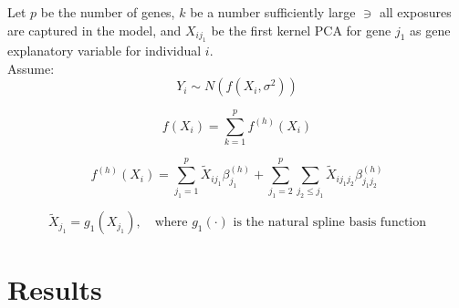 \documentclass{article}\usepackage[]{graphicx}\usepackage[]{color}
\begin{document}
Let $p$ be the number of genes, $k$ be a number sufficiently large $\ni$ all exposures are captured in the model, and $X_{ij_1}$ be the first kernel PCA for gene $j_1$ as gene explanatory variable for individual $i$.\\

Assume:\\
\begin{equation}
Y_i \sim N(f(X_i, \sigma^2)) \tag{1.1}
\end{equation}

\begin{equation}
f(X_i) = \sum_{k=1}^p f^{(h)}(X_i) \tag{1.2}
\end{equation}

\begin{equation}
f^{(h)}(X_i) = \sum_{j_1 =1}^p \tilde{X}_{ij_1}\beta_{j_1}^{(h)} + \sum_{j_1 = 2}^p \sum_{j_2 \le j_1} \tilde{X}_{ij_1j_2}\beta_{j_1j_2}^{(h)} \tag{1.3}
\end{equation}

\begin{equation}
\tilde{X}_{j_1} = g_1(X_{j_1}), \quad \text{where } g_1(\cdot) \text{ is the natural spline basis function} \tag{1.4}
\end{equation}







\newpage
\section{Results}
\end{document}

